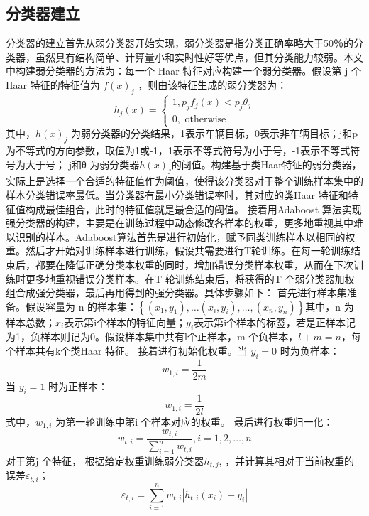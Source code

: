 \documentclass{article}
\begin{document}
\subsection{分类器建立}
分类器的建立首先从弱分类器开始实现，弱分类器是指分类正确率略大于50％的分类器，虽然具有结构简单、计算量小和实时性好等优点，但其分类能力较弱。本文中构建弱分类器的方法为：每一个 Haar 特征对应构建一个弱分类器。假设第 j 个 Haar 特征的特征值为 $f (x)_j$ ，则由该特征生成的弱分类器为：
$$h_{j}(x)=\left\{\begin{array}{l}{1, p_{j} f_{j}(x)<p_{j} \theta_{j}} \\ {0, \text { otherwise }}\end{array}\right.$$
其中，$h (x)_j$ 为弱分类器的分类结果，1表示车辆目标，0表示非车辆目标；j和p为不等式的方向参数，取值为1或-1，1表示不等式符号为小于号，-1表示不等式符号为大于号； j和θ 为弱分类器$h (x)_j$的阈值。构建基于类Haar特征的弱分类器，实际上是选择一个合适的特征值作为阈值，使得该分类器对于整个训练样本集中的样本分类错误率最低。当分类器有最小分类错误率时，其对应的类Haar 特征和特征值构成最佳组合，此时的特征值就是最合适的阈值。
\newline\newline
接着用Adaboost 算法实现强分类器的构建，主要是在训练过程中动态修改各样本的权重，更多地重视其中难以识别的样本。Adaboost算法首先是进行初始化，赋予同类训练样本以相同的权重。然后才开始对训练样本进行训练，假设共需要进行T轮训练。在每一轮训练结束后，都要在降低正确分类本权重的同时，增加错误分类样本权重，从而在下次训练时更多地重视错误分类样本。在T 轮训练结束后，将获得的T 个弱分类器加权组合成强分类器，最后再用得到的强分类器。具体步骤如下：
\newline\newline
首先进行样本集准备。假设容量为 n 的样本集：$\left\{\left(x_{1}, y_{1}\right), \ldots\left(x_{i}, y_{i}\right), \ldots,\left(x_{n}, y_{n}\right)\right\}$其中，n 为样本总数；$x_i$表示第i个样本的特征向量；$y_i$表示第i个样本的标签，若是正样本记为1，负样本则记为0。假设样本集中共有l个正样本，m 个负样本，$l +m = n$，每个样本共有k个类Haar 特征。
\newline\newline
接着进行初始化权重。当 $y_i=0$ 时为负样本：$$w_{1, i}=\frac{1}{2 m}$$当 $y_i=1$ 时为正样本：$$w_{1, i}=\frac{1}{2 l}$$式中，$w_{1,i}$ 为第一轮训练中第i 个样本对应的权重。
\newline\newline
最后进行权重归一化：$$w_{t, i}=\frac{w_{t, i}}{\sum_{i=1}^{n} w_{t, i}}, i=1,2, \ldots, n$$
对于第j 个特征， 根据给定权重训练弱分类器$h_{t,j}$, ，并计算其相对于当前权重的误差$ε_{t,i}$；$$\varepsilon_{t, i}=\sum_{i=1}^{n} w_{t, i}\left|h_{t, i}\left(x_{i}\right)-y_{i}\right|$$
\end{document}
